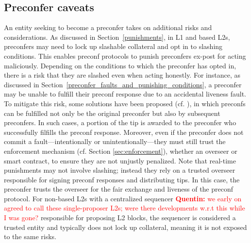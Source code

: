 \documentclass[a4paper]{article}
\theoremstyle{boldstyle}
\newlength{\entrysep}
\newcommand{\risk}[1]{\par\noindent\textbf{\textcolor{black}{Risk:}} #1\par\vspace{\entrysep}}
\newcommand{\mitigation}[1]{\par\noindent\textbf{\textcolor{black}{Mitigation:}} #1}
\newcommand{\qb}[1]{\textcolor{red}{\textbf{Quentin:} #1}}
\newcommand{\dk}[1]{\textcolor{cyan}{\textbf{Demetris:} #1}}
\begin{document}
\iffalse
    \subsection{Preconfer caveats} \label{preconfer_caveats}
    An entity seeking to become a preconfer takes on additional risks and considerations. As discussed in Section~\ref{punishments}, in L1 and based L2s, preconfers may need to lock up slashable collateral and opt in to slashing conditions. This enables preconf protocols to punish preconfers ex-post for acting maliciously. Depending on the conditions to which the preconfer has opted in, there is a risk that they are slashed even when acting honestly. For instance, as discussed in Section~\ref{preconfer_faults_and_punishing_conditions}, a preconfer may be unable to fulfill their preconf response due to an accidental liveness fault. To mitigate this risk, some solutions have been proposed (cf. \cite{W:AvoidingAccidentalLivenessFaultsforBasedPreconfs}), in which preconfs can be fulfilled not only be the original preconfer but also by subsequent preconfers. In such cases, a portion of the tip is awarded to the preconfer who successfully filfills the preconf response. Moreover, even if the preconfer does not commit a fault—intentionally or unintentionally—they must still trust the enforcement mechanism (cf. Section \ref{sec:enforcement}), whether an overseer or smart contract, to ensure they are not unjustly penalized. Note that real-time punishments may not involve slashing; instead they rely on a trusted overseer responsible for signing preconf responses and distributing tips. In this case, the preconfer trusts the overseer for the fair exchange and liveness of the preconf protocol. For non-based L2s with a centralized sequencer \qb{we early on agreed to call these single-proposer L2s; were there developments w.r.t this while I was gone?} responsible for proposing L2 blocks, the sequencer is considered a trusted entity and typically does not lock up collateral, meaning it is not exposed to the same risks. 
    
\end{document}
